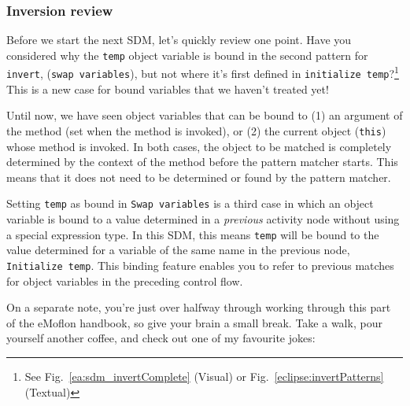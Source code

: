 \newpage
\subsubsection{Inversion review}
\genHeader
\hypertarget{invert close}{}

Before we start the next SDM, let's quickly review one point. Have you considered why the \texttt{temp} object variable is bound in the second pattern for
\texttt{invert}, (\texttt{swap variables}), but not where it's first defined in \texttt{initialize temp}?\footnote{See Fig.~\ref{ea:sdm_invertComplete}
(Visual) or Fig.~\ref{eclipse:invertPatterns} (Textual)} This is a new case for bound variables that we haven't treated yet!

Until now, we have seen object variables that can be bound to (1) an argument of the method (set when the method is invoked), or (2) the
current object (\texttt{this}) whose method is invoked. In both cases, the object to be matched is completely determined by the context of the method before
the pattern matcher starts. This means that it does not need to be determined or found by the pattern matcher.

Setting \texttt{temp} as bound in \texttt{Swap variables} is a third case in which an object variable is bound to a value determined in a \emph{previous}
activity node without using a special expression type. In this SDM, this means \texttt{temp} will be bound to the value determined for a variable
of the same name in the previous node, \texttt{Initialize temp}. This binding feature enables you to refer to previous matches for object variables in the
preceding control flow.

On a separate note, you're just over halfway through working through this part of the eMoflon handbook, so give your brain a small break. Take a walk, pour
yourself another coffee, and check out one of my favourite jokes:

\vspace{0.5cm}

